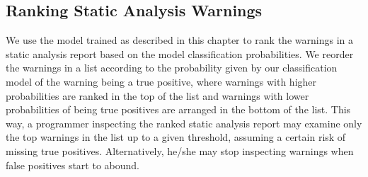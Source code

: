 \subsection{Ranking Static Analysis Warnings}
\label{subsec:ranking}

We use the model trained as described in this chapter to rank the warnings in a
static analysis report based on the model classification probabilities. We
reorder the warnings in a list according to the probability given by our
classification model of the warning being a true positive, where warnings with
higher probabilities are ranked in the top of the list and warnings with lower
probabilities of being true positives are arranged in the bottom of the list.
This way, a programmer inspecting the ranked static analysis report may examine
only the top warnings in the list up to a given threshold, assuming a certain
risk of missing true positives. Alternatively, he/she may stop inspecting
warnings when false positives start to abound.
